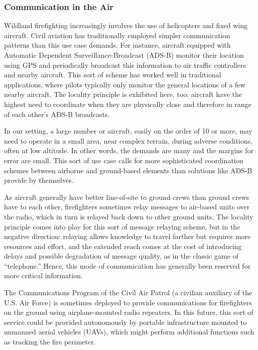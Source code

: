 \documentclass[]             %
{NASA}                       %
\theoremstyle{definition}
\begin{document}
\subsubsection{Communication in the Air}
Wildland firefighting increasingly involves the use of helicopters and
fixed wing aircraft. Civil aviation has traditionally employed simpler
communication patterns than this use case demands. For instance,
aircraft equipped with Automatic Dependent Surveillance-Broadcast
(ADS-B) monitor their location using GPS and periodically broadcast
this information to air traffic controllers and nearby aircraft. This
sort of scheme has worked well in traditional applications, where
pilots typically only monitor the general locations of a few nearby
aircraft. The locality principle is exhibited here, too: aircraft have
the highest need to coordinate when they are physically close and
therefore in range of each other's ADS-B broadcasts.

In our setting, a large number or aircraft, easily on the order of 10 or
more, may need to operate in a small area, near complex terrain,
during adverse conditions, often at low altitude. In other words, the
demands are many and the margins for error are small. This sort of use
case calls for more sophisticated coordination schemes between
airborne and ground-based elements than solutions like ADS-B provide
by themselves.

As aircraft generally have better line-of-site to ground crews than
ground crews have to each other, firefighters sometimes relay messages
to air-based units over the radio, which in turn is relayed back down
to other ground units. The locality principle comes into play for this
sort of message relaying scheme, but in the negative direction:
relaying allows knowledge to travel farther but requires more resources and effort,
and the extended reach comes at the cost of introducing delays and
possible degradation of message quality, as in the classic game of
``telephone.'' Hence, this mode of communication has generally been reserved for
more critical information.

The Communications Program of the Civil Air Patrol (a civilian
auxiliary of the U.S. Air Force) is sometimes deployed to provide
communications for firefighters on the ground using airplane-mounted
radio repeaters. In this future, this sort of service could be
provided autonomously by portable infrastructure mounted to unmanned
aerial vehicles (UAVs), which might perform additional functions such
as tracking the fire perimeter.
\end{document}
